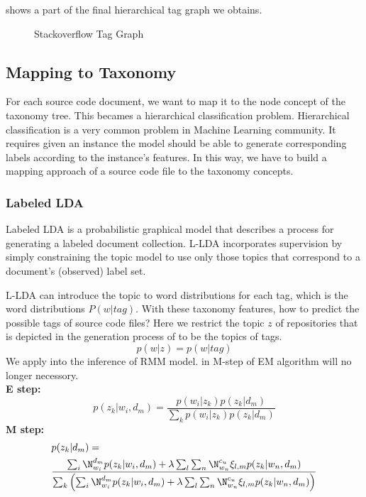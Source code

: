  shows a part of the final hierarchical tag graph we
obtains.

\begin{figure}[h]
\begin{center}
\caption{Stackoverflow Tag Graph}
\label{fig:tagraph}
\end{center}
\end{figure}

\subsection{Mapping to Taxonomy}
\label{sec:map}

For each source code document, we want to map it to the node concept of the 
taxonomy tree. This becames a hierarchical classification problem. 
Hierarchical classification is a very common problem in Machine
Learning community. It requires given an instance the model should
be able to generate corresponding labels according to the instance's
features. In this way, we have to build a mapping approach of a source code 
file to the taxonomy concepts.

\subsubsection{Labeled LDA}
Labeled LDA is a probabilistic graphical model that describes a process for 
generating a labeled document collection. L-LDA incorporates supervision by 
simply constraining the topic model to use only those topics that correspond 
to a document’s (observed) label set.

L-LDA can introduce the topic to word distributions for each tag, which is the
word distributions $P(w|tag)$. With these taxonomy features, how to predict
the possible tags of source code files? Here we restrict the topic $z$ of repositories
that is depicted in the generation process of  to be the
topics of tags.
\[
\label{ztag}
p(w|z)=p(w|tag)\]
We apply  into the inference of RMM model.  in M-step
of EM algorithm will no longer necessory.\\
{\bf E step:}
\[p(z_k|w_i,d_m) = \frac { p(w_i|z_k)p(z_k|d_m) }{ \sum _{k}{p(w_i|z_k)p(z_k|d_m)} }\]
{\bf M step:}
\begin{align}
\label{equ:mstep2}
\begin{split}
&p(z_k|d_m) = \\
&\frac{\sum _{i}{\N_{w_i}^{d_m}p(z_k|w_i,d_m)+\lambda \sum _{l} \sum _{n}{\N_{w_n}^{c_u}\xi  _{l,m}p(z_k|w_n,d_m)}}}{\sum _{k}\left(\sum _{i}{\N_{w_i}^{d_m}p(z_k|w_i,d_m)+\lambda \sum _{l} \sum _{n}{\N_{w_n}^{c_u}\xi  _{l,m}p(z_k|w_n,d_m)}}\right)}\\
\end{split}
\end{align}

